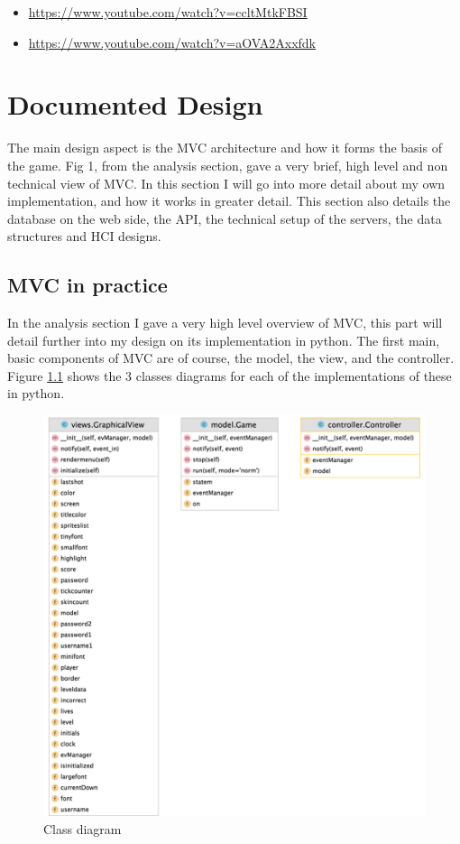 \documentclass[a4paper, 11pt]{report}
\begin{document}
\begin{itemize}
    \item \href{Video of screenplay, also useful to help create sound}{https://www.youtube.com/watch?v=ccltMtkFBSI}
    
    \item \href{Video of screenplay, also useful to help create sound}{https://www.youtube.com/watch?v=aOVA2Axxfdk}
\end{itemize}



\chapter{Documented Design}
The main design aspect is the MVC architecture and how it forms the basis of the game. Fig 1, from the analysis section, gave a very brief, high level and non technical view of MVC. In this section I will go into more detail about my own implementation, and how it works in greater detail. This section also details the database on the web side, the API, the technical setup of the servers, the data structures and HCI designs.

\section{MVC in practice}
In the analysis section I gave a very high level overview of MVC, this part will detail further into my design on its implementation in python. The first main, basic components of MVC are of course, the model, the view, and the controller. Figure \ref{fig:MVC_class} shows the 3 classes diagrams for each of the implementations of these in python.

\begin{figure}[!ht]
  \includegraphics[width=0.8\linewidth]{mvc.png}
  \centering
  \caption{Class diagram}
  \label{fig:MVC_class}
\end{figure}
\end{document}
